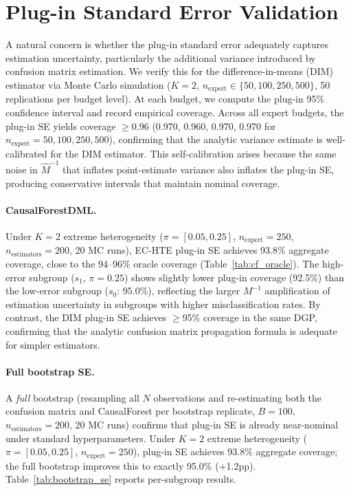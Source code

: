 \section{Plug-in Standard Error Validation}
\label{app:bootstrap_se}

A natural concern is whether the plug-in standard error adequately captures estimation uncertainty, particularly the additional variance introduced by confusion matrix estimation.
We verify this for the difference-in-means (DIM) estimator via Monte Carlo simulation ($K{=}2$, $n_{\text{expert}} \in \{50, 100, 250, 500\}$, 50 replications per budget level).
At each budget, we compute the plug-in 95\% confidence interval and record empirical coverage.
Across all expert budgets, the plug-in SE yields coverage $\geq 0.96$ (0.970, 0.960, 0.970, 0.970 for $n_{\text{expert}} = 50, 100, 250, 500$), confirming that the analytic variance estimate is well-calibrated for the DIM estimator.
This self-calibration arises because the same noise in $\hat{M}^{-1}$ that inflates point-estimate variance also inflates the plug-in SE, producing conservative intervals that maintain nominal coverage.

\paragraph{CausalForestDML.}
Under $K{=}2$ extreme heterogeneity ($\pi{=}[0.05, 0.25]$, $n_{\text{expert}}{=}250$, $n_{\text{estimators}}{=}200$, 20 MC runs), EC-HTE plug-in SE achieves 93.8\% aggregate coverage, close to the 94--96\% oracle coverage (Table~\ref{tab:cf_oracle}).
The high-error subgroup ($s_1$, $\pi{=}0.25$) shows slightly lower plug-in coverage (92.5\%) than the low-error subgroup ($s_0$: 95.0\%), reflecting the larger $M^{-1}$ amplification of estimation uncertainty in subgroups with higher misclassification rates.
By contrast, the DIM plug-in SE achieves $\geq$95\% coverage in the same DGP, confirming that the analytic confusion matrix propagation formula is adequate for simpler estimators.

\paragraph{Full bootstrap SE.}
A \emph{full} bootstrap (resampling all $N$ observations and re-estimating both the confusion matrix and CausalForest per bootstrap replicate, $B{=}100$, $n_{\text{estimators}}{=}200$, 20 MC runs) confirms that plug-in SE is already near-nominal under standard hyperparameters.
Under $K{=}2$ extreme heterogeneity ($\pi{=}[0.05, 0.25]$, $n_{\text{expert}}{=}250$), plug-in SE achieves 93.8\% aggregate coverage; the full bootstrap improves this to exactly 95.0\% ($+$1.2pp).
Table~\ref{tab:bootstrap_se} reports per-subgroup results.

